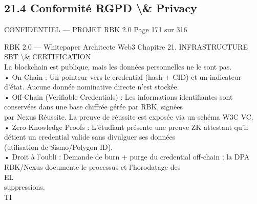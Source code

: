 \documentclass[12pt,landscape,a4paper]{article}
\newenvironment{confidential}
{\begin{tcolorbox}[
    colback=rbkred!5!white,
    colframe=rbkred!75!black,
    title=CONFIDENTIEL,
    fonttitle=\bfseries\color{white},
    coltitle=rbkred!75!black,
    breakable,
    enhanced,
    frame hidden,
    borderline west={2pt}{0pt}{rbkred!75!black}
]}
{\end{tcolorbox}}
\begin{document}
\subsection{21.4 Conformité RGPD \textbackslash{}& Privacy}
\vspace{0.5em}
\begin{confidential}CONFIDENTIEL — PROJET RBK 2.0                                   Page 171 sur 316\end{confidential}
RBK 2.0 — Whitepaper Architecte Web3                                                Chapitre 21. INFRASTRUCTURE SBT \textbackslash{}& CERTIFICATION\\
\vspace{0.5em}
\vspace{0.5em}
\vspace{0.5em}
La blockchain est publique, mais les données personnelles ne le sont pas.\\
\vspace{0.5em}
• On-Chain : Un pointeur vers le credential (hash + CID) et un indicateur d’état. Aucune donnée nominative directe n’est stockée.\\
\vspace{0.5em}
• Off-Chain (Verifiable Credentials) : Les informations identifiantes sont conservées dans une base chiffrée gérée par RBK, signées\\
par Nexus Réussite. La preuve de réussite est exposée via un schéma W3C VC.\\
\vspace{0.5em}
• Zero-Knowledge Proofs : L’étudiant présente une preuve ZK attestant qu’il détient un credential valide sans divulguer ses données\\
(utilisation de Sismo/Polygon ID).\\
\vspace{0.5em}
• Droit à l’oubli : Demande de burn + purge du credential off-chain ; la DPA RBK/Nexus documente le processus et l’horodatage des\\
\vspace{0.5em}
\vspace{0.5em}
\vspace{0.5em}
\vspace{0.5em}
EL\\
suppressions.\\
\vspace{0.5em}
\vspace{0.5em}
\vspace{0.5em}
\vspace{0.5em}
TI\\
\end{document}
